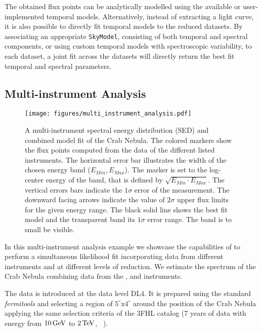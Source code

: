 \documentclass[traditabstract, longauth]{aa}
\newcommand{\code}[1]{\texttt{#1}}
\begin{document}
%
The obtained flux points can be analytically modelled using the available or
user-implemented temporal models. Alternatively, instead of  extracting a
light curve, it is also possible to directly fit temporal models to the reduced
datasets. By associating an appropriate \code{SkyModel}, consisting of both temporal
and spectral components, or using custom temporal models with spectroscopic
variability, to each dataset, a joint fit across the datasets will directly
return the best fit temporal and spectral parameters.

\subsection{Multi-instrument Analysis}
\label{ssec:multi-instrument-analysis}
%
\begin{figure*}[t]
	\sidecaption
	\texttt{[image: figures/multi\_instrument\_analysis.pdf]}
	\caption{
        A multi-instrument spectral energy distribution (SED) and combined model fit
        of the Crab Nebula. The  colored markers show the flux points computed from
        the data of the different listed instruments. The horizontal error bar
        illustrates the width of the chosen energy band ($E_{Min}, E_{Max}$).
        The marker is set to the log-center energy of the band, that is
        defined by $\sqrt{E_{Min} \cdot E_{Max}}$. The vertical errors bars
        indicate the $1\sigma$ error of the measurement. The downward
        facing arrows indicate the value of $2\sigma$ upper flux limits
        for the given energy range. The black solid line shows the best
        fit model and the transparent band its $1\sigma$ error range.
		The band is to small be visible.
    }
	\label{fig:multi_instrument_analysis}
\end{figure*}
%
In this multi-instrument analysis example we showcase the capabilities of
\gammapy to perform a simultaneous likelihood fit incorporating data from
different instruments and at different levels of reduction. We estimate the
spectrum of the Crab Nebula combining data from the \fermi, \magic and \hawc
instruments.

The \fermi data is introduced at the data level DL4. It is prepared 
using the standard \textit{fermitools} \citep{Fermitools2019} and
selecting a region of $5^{\circ} \mathrm{x} 4^{\circ}$ around the
position of the Crab Nebula applying the same selection criteria of the 3FHL
catalog (7 years of data with energy from $10\,{\rm GeV}$ to $2\,{\rm TeV}$,
~\citealt{3FHL}).
\end{document}
